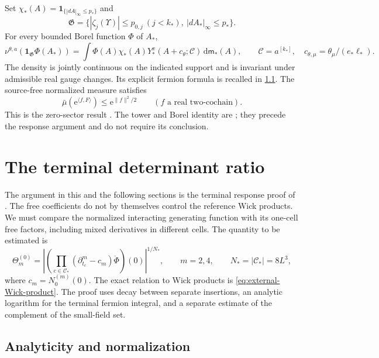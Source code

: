 \documentclass[11pt,letterpaper,reqno]{amsart}
\newcommand{\dd}{\mathrm d}
\begin{document}
Set $\chi_*(A)=\mathbf1_{\{|dA|_\infty\le p_*\}}$ and
\[
 \mathfrak G=\{|\zeta_j(\Upsilon)|\le p_{0,j}\ (j<k_*),\
                                  |dA_*|_\infty\le p_*\}.
\]
For every bounded Borel function $\Phi$ of $A_*$,
\begin{equation}\label{eq:rrm-terminal-Borel}
 \nu^{\theta,a}(\mathbf1_{\mathfrak G}\Phi(A_*))
 =\int\Phi(A)\chi_*(A)
             Y_*^x(A+c_\theta;\mathscr C)\,\dd\mathsf m_*(A),
 \qquad \mathscr C=a^{[k_*]},\quad
 c_{\theta,\mu}=\theta_\mu/(e_*\ell_*).
\end{equation}
The density is jointly continuous on the indicated support and is
invariant under admissible real gauge changes. Its explicit fermion
formula is recalled in \cref{subsec:interacting-determinant-ratio}.
The source-free normalized measure satisfies
\begin{equation}\label{eq:rrm-zero-Gaussian}
 \bar\mu(\mathrm e^{\langle f,F\rangle})\le \mathrm e^{\|f\|^2/2}
                 \qquad(f\text{ a real two-cochain}).
\end{equation}
This is the zero-sector result
\cite[Proposition~2.1]{TerminalPressure}.
The tower and Borel identity are
\cite[Proposition~3.1, Theorem~B]{TerminalPressure}; they precede
the response argument and do not require its conclusion.
\section{The terminal determinant ratio}
\label{sec:interacting-response}

The argument in this and the following sections is the terminal
response proof of \cite[\S23]{QED3Master}.
The free coefficients do not by themselves control the
reference Wick products. We must compare the normalized
interacting generating function with its one-cell free
factors, including mixed derivatives in different cells.
The quantity to be estimated is
\begin{equation}\label{eq:interacting-reference-error}
 \Theta_m^{(0)}=
 \left|\left(\prod_{c\in\mathcal C_*}
       (\partial_{t_c}^m-c_m)\mathring\Phi\right)(0)\right|^{1/N_*},
 \qquad m=2,4,\qquad N_*=|\mathcal C_*|=8L^3,
\end{equation}
where $c_m=N_0^{(m)}(0)$. The exact relation to Wick
products is \eqref{eq:external-Wick-product}.
The proof uses decay between separate insertions,
an analytic logarithm for the terminal fermion integral,
and a separate estimate of the complement of the
small-field set.

\subsection{Analyticity and normalization}
\label{subsec:interacting-determinant-ratio}
\end{document}
